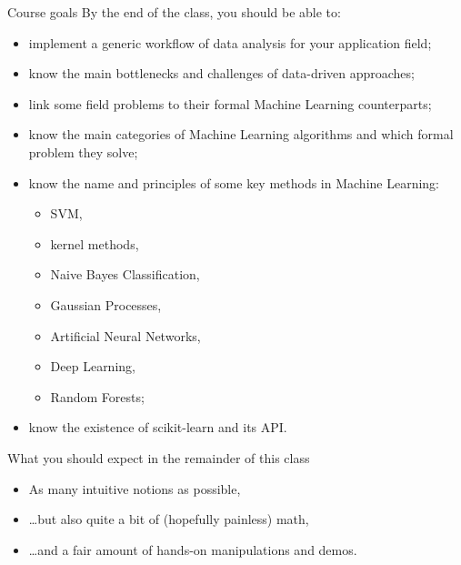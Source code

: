 \documentclass{beamer}
\begin{document}
\begin{frame}{Course goals}
\small
By the end of the class, you should be able to:
\begin{itemize}
\item implement a generic workflow of data analysis for your application field;
\item know the main bottlenecks and challenges of data-driven approaches;
\item link some field problems to their formal Machine Learning counterparts;
\item know the main categories of Machine Learning algorithms and which formal problem they solve;
\item know the name and principles of some key methods in Machine Learning:
\begin{itemize}
\item SVM,
\item kernel methods,
\item Naive Bayes Classification,
\item Gaussian Processes,
\item Artificial Neural Networks,
\item Deep Learning,
\item Random Forests;
\end{itemize} 
\item know the existence of scikit-learn and its API.
\end{itemize}
\end{frame}

\begin{frame}{What you should expect in the remainder of this class}
\begin{itemize}
\item As many intuitive notions as possible,
\item \ldots but also quite a bit of (hopefully painless) math,\\
\item \ldots and a fair amount of hands-on manipulations and demos.
\end{itemize}
\end{frame}
\end{document}
